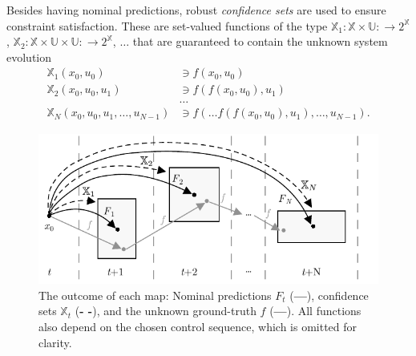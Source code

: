 Besides having nominal predictions, robust \textit{confidence sets} are used to ensure constraint satisfaction. These are set-valued functions of the type $\mathbb{X}_1: \mathbb{X} \times \mathbb{U} : \rightarrow 2^{\mathbb{X}}$, $\mathbb{X}_2: \mathbb{X} \times \mathbb{U} \times \mathbb{U} : \rightarrow 2^{\mathbb{X}}$, $\dots$ that are guaranteed to contain the unknown system evolution
%
\begin{equation}
	\begin{aligned}
		\mathbb{X}_1(x_0,u_0) &\ni f(x_0,u_0) \\
		\mathbb{X}_2(x_0,u_0,u_1) &\ni f(f(x_0,u_0),u_1) \\
		& \dots \\
		\mathbb{X}_N(x_0,u_0,u_1,\dots,u_{N-1}) &\ni f(\dots f(f(x_0,u_0),u_1),\dots,u_{N-1}).
	\end{aligned}
	\label{eq.setValueds}
\end{equation}

\begin{figure}[b!]
	\centering
	\includegraphics{../images/chap2_kpc_sets.pdf} 
	\caption{
	The outcome of each map: Nominal predictions $F_t$ (\textbf{---}), confidence sets $\mathbb{X}_t$ (\textbf{- -}), and the unknown ground-truth $f$  (\textcolor{kindagray}{\textbf{---}}). All functions also depend on the chosen control sequence, which is omitted for clarity.}
	\label{fig.kpc_sets}
\end{figure}

